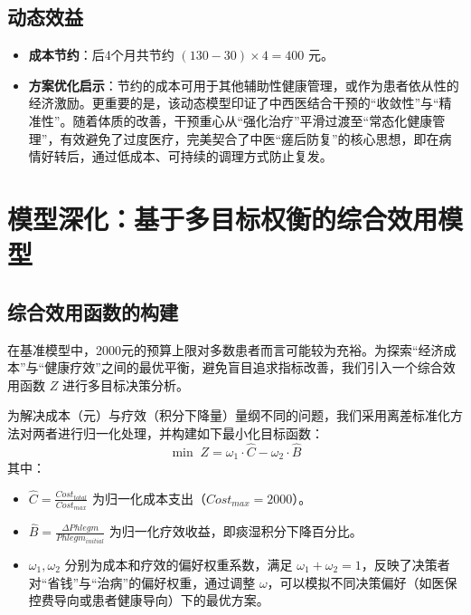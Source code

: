 \documentclass[12pt,a4paper]{article}
\begin{document}
\subsection{动态效益}
\begin{itemize}
    \item \textbf{成本节约}：后4个月共节约 $(130-30) \times 4 = 400$ 元。
    \item \textbf{方案优化启示}：节约的成本可用于其他辅助性健康管理，或作为患者依从性的经济激励。更重要的是，该动态模型印证了中西医结合干预的“收敛性”与“精准性”。随着体质的改善，干预重心从“强化治疗”平滑过渡至“常态化健康管理”，有效避免了过度医疗，完美契合了中医“瘥后防复”的核心思想，即在病情好转后，通过低成本、可持续的调理方式防止复发。
\end{itemize}

\section{模型深化：基于多目标权衡的综合效用模型}

\subsection{综合效用函数的构建}
在基准模型中，2000元的预算上限对多数患者而言可能较为充裕。为探索“经济成本”与“健康疗效”之间的最优平衡，避免盲目追求指标改善，我们引入一个综合效用函数 $Z$ 进行多目标决策分析。

为解决成本（元）与疗效（积分下降量）量纲不同的问题，我们采用离差标准化方法对两者进行归一化处理，并构建如下最小化目标函数：
\begin{equation}
\min \; Z = \omega_1 \cdot \hat{C} - \omega_2 \cdot \hat{B}
\end{equation}
其中：
\begin{itemize}
    \item $\hat{C} = \frac{Cost_{total}}{Cost_{max}}$ 为归一化成本支出（$Cost_{max}=2000$）。
    \item $\hat{B} = \frac{\Delta Phlegm}{Phlegm_{initial}}$ 为归一化疗效收益，即痰湿积分下降百分比。
    \item $\omega_1, \omega_2$ 分别为成本和疗效的偏好权重系数，满足 $\omega_1 + \omega_2 = 1$，反映了决策者对“省钱”与“治病”的偏好权重，通过调整 $\omega$，可以模拟不同决策偏好（如医保控费导向或患者健康导向）下的最优方案。
\end{itemize}
\end{document}

